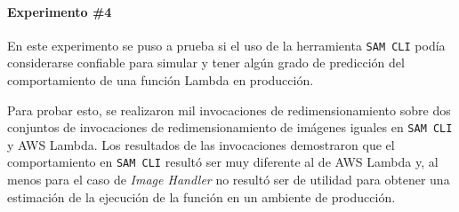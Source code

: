 \paragraph{Experimento \#4} En este experimento se puso a prueba si el uso de la herramienta \texttt{SAM CLI} podía considerarse confiable para simular y tener algún grado de predicción del comportamiento de una función Lambda en producción. 

Para probar esto, se realizaron mil invocaciones de redimensionamiento sobre dos conjuntos de invocaciones de redimensionamiento de imágenes iguales en \texttt{SAM CLI} y AWS Lambda. Los resultados de las invocaciones demostraron que el comportamiento en \texttt{SAM CLI} resultó ser muy diferente al de AWS Lambda y, al menos para el caso de \emph{Image Handler} no resultó ser de utilidad para obtener una estimación de la ejecución de la función en un ambiente de producción.








